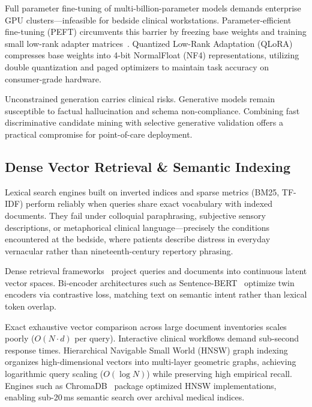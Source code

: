 Full parameter fine-tuning of multi-billion-parameter models demands enterprise GPU clusters---infeasible for bedside clinical workstations. Parameter-efficient fine-tuning (PEFT) circumvents this barrier by freezing base weights and training small low-rank adapter matrices~\cite{hu2022lora}. Quantized Low-Rank Adaptation (QLoRA)~\cite{dettmers2023qlora} compresses base weights into 4-bit NormalFloat (NF4) representations, utilizing double quantization and paged optimizers to maintain task accuracy on consumer-grade hardware.

Unconstrained generation carries clinical risks. Generative models remain susceptible to factual hallucination and schema non-compliance. Combining fast discriminative candidate mining with selective generative validation offers a practical compromise for point-of-care deployment.

\subsection{Dense Vector Retrieval \& Semantic Indexing}

Lexical search engines built on inverted indices and sparse metrics (BM25, TF-IDF) perform reliably when queries share exact vocabulary with indexed documents. They fail under colloquial paraphrasing, subjective sensory descriptions, or metaphorical clinical language---precisely the conditions encountered at the bedside, where patients describe distress in everyday vernacular rather than nineteenth-century repertory phrasing.

Dense retrieval frameworks~\cite{karpukhin2020dense} project queries and documents into continuous latent vector spaces. Bi-encoder architectures such as Sentence-BERT~\cite{reimers2019sentence} optimize twin encoders via contrastive loss, matching text on semantic intent rather than lexical token overlap.

Exact exhaustive vector comparison across large document inventories scales poorly ($O(N \cdot d)$ per query). Interactive clinical workflows demand sub-second response times. Hierarchical Navigable Small World (HNSW) graph indexing~\cite{malkov2018efficient} organizes high-dimensional vectors into multi-layer geometric graphs, achieving logarithmic query scaling ($O(\log N)$) while preserving high empirical recall. Engines such as ChromaDB~\cite{chromadb2023} package optimized HNSW implementations, enabling sub-20\,ms semantic search over archival medical indices.

